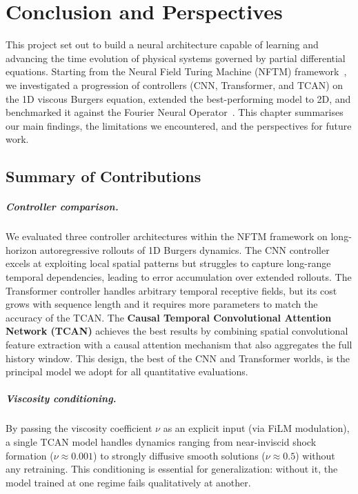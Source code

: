 
\chapter{Conclusion and Perspectives}
\label{chap:conclusion}

This project set out to build a neural architecture capable of learning and advancing the time evolution of physical systems governed by partial differential equations. Starting from the Neural Field Turing Machine (NFTM) framework~\cite{malhotra2025neuralfieldturingmachine}, we investigated a progression of controllers (CNN, Transformer, and TCAN) on the 1D viscous Burgers equation, extended the best-performing model to 2D, and benchmarked it against the Fourier Neural Operator~\cite{li2021fourier}. This chapter summarises our main findings, the limitations we encountered, and the perspectives for future work.

\section{Summary of Contributions}
\label{sec:conclusion_summary}

\paragraph{Controller comparison.}
We evaluated three controller architectures within the NFTM framework on long-horizon autoregressive rollouts of 1D Burgers dynamics. The CNN controller excels at exploiting local spatial patterns but struggles to capture long-range temporal dependencies, leading to error accumulation over extended rollouts. The Transformer controller handles arbitrary temporal receptive fields, but its cost grows with sequence length and it requires more parameters to match the accuracy of the TCAN. The \textbf{Causal Temporal Convolutional Attention Network (TCAN)} achieves the best results by combining spatial convolutional feature extraction with a causal attention mechanism that also aggregates the full history window. This design, the best of the CNN and Transformer worlds, is the principal model we adopt for all quantitative evaluations.

\paragraph{Viscosity conditioning.}
By passing the viscosity coefficient $\nu$ as an explicit input (via FiLM modulation), a single TCAN model handles dynamics ranging from near-inviscid shock formation ($\nu \approx 0.001$) to strongly diffusive smooth solutions ($\nu \approx 0.5$) without any retraining. This conditioning is essential for generalization: without it, the model trained at one regime fails qualitatively at another.

